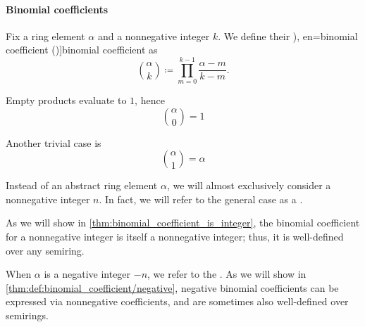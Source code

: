 \paragraph{Binomial coefficients}

\begin{definition}\label{def:binomial_coefficient}\mimprovised
  Fix a ring element \( \alpha \) and a nonnegative integer \( k \). We define their \term[ru=биномиальный коеффициент (\cite[100]{БелоусовТкачёв2004ДискретнаяМатематика}), en=binomial coefficient (\cite[53]{Knuth1997ArtVol1})]{binomial coefficient} as
  \begin{equation}\label{eq:def:binomial_coefficient}
    \binom \alpha k \coloneqq \prod_{m=0}^{k - 1} \frac {\alpha - m} {k - m}.
  \end{equation}

  \begin{paracol}{2}
    \begin{leftcolumn}
      Empty products evaluate to \( 1 \), hence
      \begin{equation}\label{eq:def:binomial_coefficient/zero}
        \binom \alpha 0 = 1
      \end{equation}
    \end{leftcolumn}

    \begin{rightcolumn}
      Another trivial case is
      \begin{equation}\label{eq:def:binomial_coefficient/one}
        \binom \alpha 1 = \alpha
      \end{equation}
    \end{rightcolumn}
  \end{paracol}

  Instead of an abstract ring element \( \alpha \), we will almost exclusively consider a nonnegative integer \( n \). In fact, we will refer to the general case as a .

  As we will show in \cref{thm:binomial_coefficient_is_integer}, the binomial coefficient for a nonnegative integer is itself a nonnegative integer; thus, it is well-defined over any semiring.

  When \( \alpha \) is a negative integer \( -n \), we refer to the . As we will show in \cref{thm:def:binomial_coefficient/negative}, negative binomial coefficients can be expressed via nonnegative coefficients, and are sometimes also well-defined over semirings.
\end{definition}
